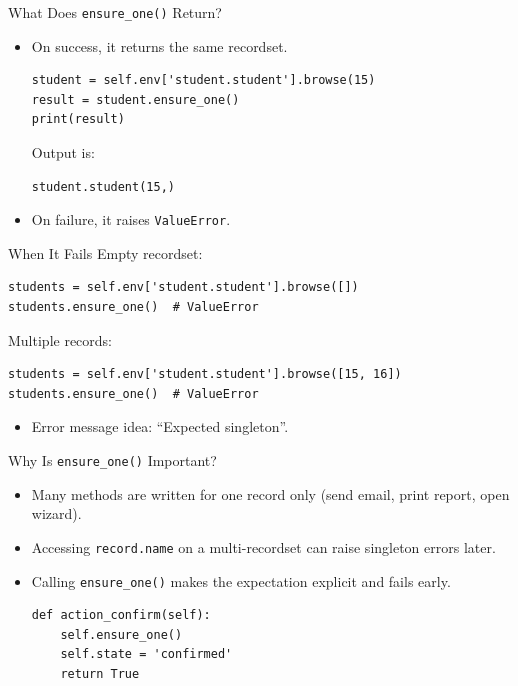 \begin{frame}[fragile]{What Does \texttt{ensure\_one()} Return?}
	\begin{block}{}
		\begin{itemize}
			\item On success, it returns the same recordset.
\begin{lstlisting}
student = self.env['student.student'].browse(15)
result = student.ensure_one()
print(result)
\end{lstlisting}
			Output is:
\begin{lstlisting}
student.student(15,)
\end{lstlisting}
			\item On failure, it raises \texttt{ValueError}.
		\end{itemize}
	\end{block}
\end{frame}

\begin{frame}[fragile]{When It Fails}
	Empty recordset:
\begin{lstlisting}
students = self.env['student.student'].browse([])
students.ensure_one()  # ValueError
\end{lstlisting}
	Multiple records:
\begin{lstlisting}
students = self.env['student.student'].browse([15, 16])
students.ensure_one()  # ValueError
\end{lstlisting}
	\begin{itemize}
		\item Error message idea: ``Expected singleton''.
	\end{itemize}
\end{frame}

\begin{frame}[fragile]{Why Is \texttt{ensure\_one()} Important?}
	\begin{itemize}
		\item Many methods are written for one record only (send email, print report, open wizard).
		\item Accessing \texttt{record.name} on a multi-recordset can raise singleton errors later.
		\item Calling \texttt{ensure\_one()} makes the expectation explicit and fails early.
\begin{lstlisting}
def action_confirm(self):
	self.ensure_one()
	self.state = 'confirmed'
	return True
\end{lstlisting}
	\end{itemize}
\end{frame}

